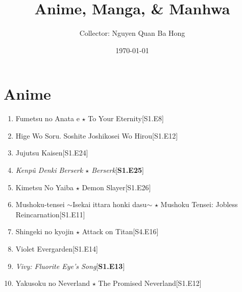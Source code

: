 \documentclass{article}
\title{Anime, Manga, {\large\&} Manhwa}
\author{Collector: Nguyen Quan Ba Hong}
\date{\today}
\numberwithin{equation}{section}
\begin{document}
\maketitle
\setcounter{secnumdepth}{6}
\setcounter{tocdepth}{6}
\tableofcontents


\section{Anime}
\begin{enumerate}
    \item Fumetsu no Anata e $\star$ To Your Eternity\hfill[S1.E8]
    \item Hige Wo Soru. Soshite Joshikosei Wo Hirou\hfill[S1.E12]
    \item Jujutsu Kaisen\hfill[S1.E24]
    \item \textit{Kenp\^u Denki Berserk $\star$ Berserk}\hfill[\textbf{S1.E25}]
    \item Kimetsu No Yaiba $\star$ Demon Slayer\hfill[S1.E26]
    \item Mushoku-tensei $\sim$Isekai ittara honki dasu$\sim$ $\star$ Mushoku Tensei: Jobless Reincarnation\hfill[S1.E11]
    \item Shingeki no kyojin $\star$ Attack on Titan\hfill[S4.E16]
    \item Violet Evergarden\hfill[S1.E14]
    \item \textit{Vivy: Fluorite Eye's Song}\hfill[\textbf{S1.E13}]
    \item Yakusoku no Neverland $\star$ The Promised Neverland\hfill[S1.E12]
\end{enumerate}
\end{document}
